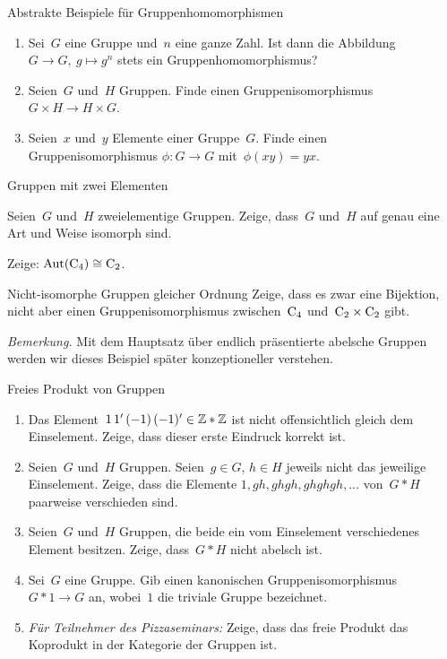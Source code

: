 \documentclass{algblatt}
\begin{document}

\begin{aufgabe}{Abstrakte Beispiele für Gruppenhomomorphismen}
\begin{enumerate}
\item Sei~$G$ eine Gruppe und~$n$ eine ganze Zahl. Ist dann die
Abbildung
$G \to G,\ g \mapsto g^n$ stets ein Gruppenhomomorphismus?
\item Seien~$G$ und~$H$ Gruppen. Finde einen Gruppenisomorphismus~$G \times H \to H \times G$.
\item Seien~$x$ und~$y$ Elemente einer Gruppe~$G$. Finde einen
Gruppenisomorphismus \linebreak
$\phi : G \to G$ mit~$\phi(xy) = yx$.
\end{enumerate}
\end{aufgabe}

\begin{aufgabeE}{Gruppen mit zwei Elementen}
\item Seien~$G$ und~$H$ zweielementige Gruppen. Zeige, dass~$G$ und~$H$ auf
genau eine Art und Weise isomorph sind.
\item Zeige: $\mathrm{Aut}(\mathrm{C}_4) \cong \mathrm{C}_2$.
\end{aufgabeE}

\begin{aufgabe}{Nicht-isomorphe Gruppen gleicher Ordnung}
Zeige, dass es zwar eine Bijektion, nicht aber einen Gruppenisomorphismus
zwischen~$\mathrm{C}_4$ und~$\mathrm{C}_2 \times \mathrm{C}_2$ gibt.

\emph{Bemerkung.} Mit dem Hauptsatz über endlich präsentierte abelsche Gruppen
werden wir dieses Beispiel später konzeptioneller verstehen.
\end{aufgabe}

\begin{aufgabe}{Freies Produkt von Gruppen}
\begin{enumerate}
\item Das Element~$1\,1'\,(-1)\,(-1)' \in \mathbb{Z} * \mathbb{Z}$ ist nicht offensichtlich
gleich dem Einselement. Zeige, dass dieser erste Eindruck korrekt ist.
\item Seien~$G$ und~$H$ Gruppen. Seien~$g \in G$, $h \in H$ jeweils nicht das
jeweilige Einselement. Zeige, dass die Elemente
$1, gh, ghgh, ghghgh, \ldots$ von~$G * H$ paarweise verschieden sind.
\item Seien~$G$ und~$H$ Gruppen, die beide ein vom Einselement verschiedenes
Element besitzen. Zeige, dass~$G * H$ nicht abelsch ist.
\item Sei~$G$ eine Gruppe. Gib einen kanonischen Gruppenisomorphismus~$G * 1 \to G$ an,
wobei~$1$ die triviale Gruppe bezeichnet.

\tiny
\item \emph{Für Teilnehmer des Pizzaseminars:} Zeige, dass das freie
Produkt das Koprodukt in der Kategorie der Gruppen ist.
\end{enumerate}
\end{aufgabe}
\end{document}
